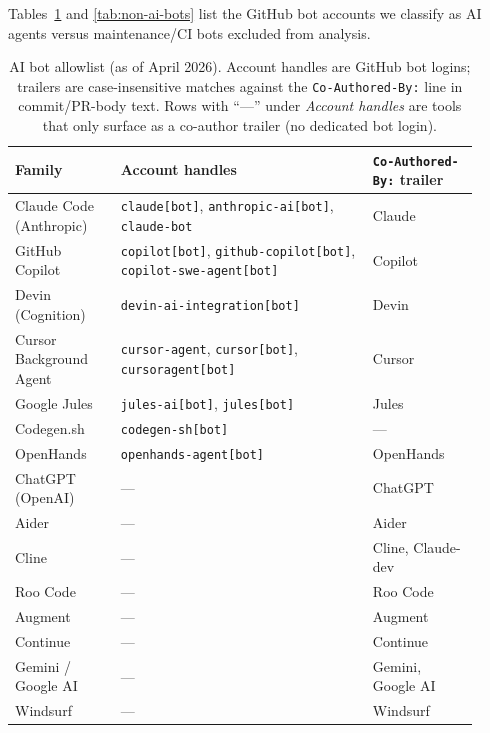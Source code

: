 
Tables~\ref{tab:ai-bots} and \ref{tab:non-ai-bots} list the GitHub bot accounts we classify as AI agents versus maintenance/CI bots excluded from analysis.

\begin{table}[h]
\centering\footnotesize
\caption{AI bot allowlist (as of April 2026). Account handles are GitHub bot logins; trailers are case-insensitive matches against the \texttt{Co-Authored-By:} line in commit/PR-body text. Rows with ``---'' under \emph{Account handles} are tools that only surface as a co-author trailer (no dedicated bot login).}
\label{tab:ai-bots}
\begin{tabular}{@{}p{0.21\linewidth} p{0.50\linewidth} p{0.21\linewidth}@{}}
\toprule
Family & Account handles & \texttt{Co-Authored-By:} trailer \\
\midrule
Claude Code (Anthropic) & \texttt{claude[bot]}, \texttt{anthropic-ai[bot]}, \texttt{claude-bot} & Claude \\
GitHub Copilot & \texttt{copilot[bot]}, \texttt{github-copilot[bot]}, \texttt{copilot-swe-agent[bot]} & Copilot \\
Devin (Cognition) & \texttt{devin-ai-integration[bot]} & Devin \\
Cursor Background Agent & \texttt{cursor-agent}, \texttt{cursor[bot]}, \texttt{cursoragent[bot]} & Cursor \\
Google Jules & \texttt{jules-ai[bot]}, \texttt{jules[bot]} & Jules \\
Codegen.sh & \texttt{codegen-sh[bot]} & --- \\
OpenHands & \texttt{openhands-agent[bot]} & OpenHands \\
\midrule
ChatGPT (OpenAI) & --- & ChatGPT \\
Aider & --- & Aider \\
Cline & --- & Cline, Claude-dev \\
Roo Code & --- & Roo Code \\
Augment & --- & Augment \\
Continue & --- & Continue \\
Gemini / Google AI & --- & Gemini, Google AI \\
Windsurf & --- & Windsurf \\
\bottomrule
\end{tabular}
\end{table}

